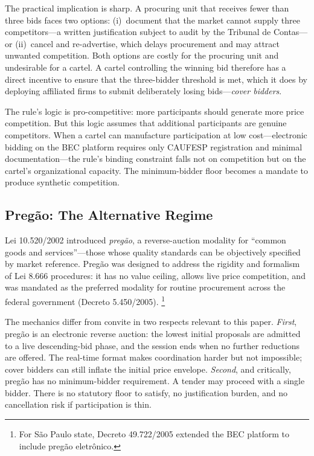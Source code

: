 The practical implication is sharp. A procuring unit that receives
fewer than three bids faces two options: (i)~document that the
market cannot supply three competitors---a written justification
subject to audit by the Tribunal de Contas---or (ii)~cancel and
re-advertise, which delays procurement and may attract unwanted
competition. Both options are costly for the procuring unit and
undesirable for a cartel. A cartel controlling the winning bid
therefore has a direct incentive to ensure that the three-bidder
threshold is met, which it does by deploying affiliated firms to
submit deliberately losing bids---\emph{cover bidders}.

The rule's logic is pro-competitive: more participants should
generate more price competition. But this logic assumes that
additional participants are genuine competitors. When a cartel
can manufacture participation at low cost---electronic bidding on
the BEC platform requires only CAUFESP registration and minimal
documentation---the rule's binding constraint falls not on
competition but on the cartel's organizational capacity. The
minimum-bidder floor becomes a mandate to produce synthetic
competition.

\subsection{Preg\~ao: The Alternative Regime}
\label{sec:pregao}

Lei 10.520/2002 introduced \emph{preg\~ao}, a reverse-auction
modality for ``common goods and services''---those whose quality
standards can be objectively specified by market reference.
Preg\~ao was designed to address the rigidity and formalism of
Lei 8.666 procedures: it has no value ceiling, allows live
price competition, and was mandated as the preferred modality for
routine procurement across the federal government (Decreto
5.450/2005).%
\footnote{For S\~ao Paulo state, Decreto 49.722/2005 extended the
BEC platform to include preg\~ao eletr\^onico.}

The mechanics differ from convite in two respects relevant to this
paper. \emph{First}, preg\~ao is an electronic reverse auction:
the lowest initial proposals are admitted to a live descending-bid
phase, and the session ends when no further reductions are
offered. The real-time format makes coordination harder but not
impossible; cover bidders can still inflate the initial price
envelope. \emph{Second}, and critically, preg\~ao has no
minimum-bidder requirement. A tender may proceed with a single
bidder. There is no statutory floor to satisfy, no justification
burden, and no cancellation risk if participation is thin.

